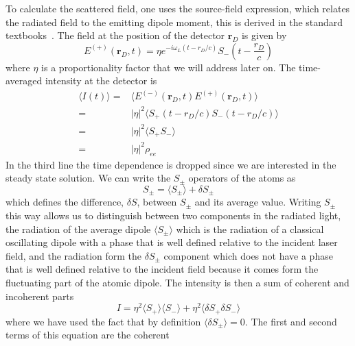 \documentclass[11pt,letter]{article}
\newcommand{\bv}[1]{\ensuremath{\bm{#1}}}
\begin{document}
To calculate the scattered field, one uses the source-field expression, which
relates the radiated field to the emitting dipole moment, this is derived in
the standard textbooks~\cite{loudon2000quantum,cohen1998atom}.  The field at
the position of the detector $\bv{r}_{D}$ is given by
\begin{equation} 
    E^{(+)}( \bv{r}_{D}, t) = 
    \eta e^{- i \omega_{L} ( t -r_{D}/c) } 
    S_{-}\left(t - \frac{ r_{D} }{c} \right)
    \label{eq:source-field} 
\end{equation} where $\eta$
is a proportionality factor that we will address later on.  The time-averaged
intensity at the detector is 
\begin{equation}
\label{eq:Idef}
\begin{split}
\langle I (t) \rangle = & 
    \langle E^{(-)}(\bv{r}_{D}, t) E^{(+)}(\bv{r}_{D}, t) \rangle \\
   = & |\eta|^{2} \langle S_{+}(t-r_{D}/c)S_{-}(t-r_{D}/c) \rangle  \\
   = & |\eta|^{2} \langle S_{+}S_{-} \rangle \\
   = & |\eta|^{2} \rho_{ee}  
\end{split} 
\end{equation}
In the third line the time dependence is dropped since we are interested in the
steady state solution.  We can write the $S_{\pm}$ operators of the atoms as 
\begin{equation} 
    S_{\pm} = \langle S_{\pm} \rangle + \delta S_{\pm} 
\end{equation}
which defines the difference, $\delta S$, between $S_{\pm}$ and its average
value.   Writing $S_{\pm}$ this way allows us to distinguish between two
components in the radiated light,  the radiation of the average dipole $\langle
S_{\pm}\rangle$ which is the radiation of a classical oscillating dipole with a
phase that is well defined relative to the incident laser field, and the
radiation form the $\delta S_{\pm}$ component which does not have a phase that
is well defined relative to the incident field because it comes form the
fluctuating part of the atomic dipole.  The intensity is then a sum of coherent
and incoherent parts 
\begin{equation} 
I  = \eta^{2} \langle S_{+}\rangle \langle S_{-} \rangle 
   + \eta^{2} \langle \delta S_{+} \delta S_{-} \rangle 
\end{equation}
where we have used the fact that by definition $\langle \delta S_{\pm}
\rangle = 0$. The first and second terms of this equation are the coherent
\end{document}
